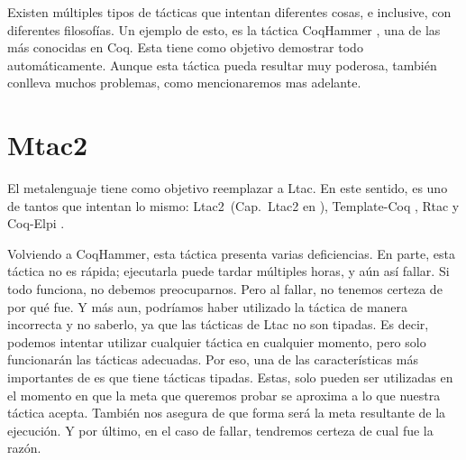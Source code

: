 Existen múltiples tipos de tácticas que intentan diferentes cosas, e inclusive, con diferentes filosofías.
Un ejemplo de esto, es la táctica CoqHammer \cite{DBLP:journals/jar/CzajkaK18}, una de las más conocidas en Coq. Esta tiene como objetivo demostrar todo automáticamente.
Aunque esta táctica pueda resultar muy poderosa, también conlleva muchos problemas, como mencionaremos mas adelante.

\section{Mtac2}

El metalenguaje \Mtac \cite{DBLP:journals/pacmpl/KaiserZKRD18} tiene como objetivo reemplazar a Ltac.
En este sentido, es uno de tantos que intentan lo mismo: Ltac2~(Cap.~Ltac2 en \cite{manual de referencia 8.11}), Template-Coq \cite{DBLP:conf/itp/AnandBCST18}, Rtac \cite{DBLP:conf/esop/MalechaB16} y Coq-Elpi \cite{tassi:hal-01637063}.

Volviendo a CoqHammer, esta táctica presenta varias deficiencias.
En parte, esta táctica no es rápida; ejecutarla puede tardar múltiples horas, y aún así fallar.
Si todo funciona, no debemos preocuparnos.
Pero al fallar, no tenemos certeza de por qué fue.
Y más aun, podríamos haber utilizado la táctica de manera incorrecta y no saberlo, ya que las tácticas de Ltac no son tipadas.
Es decir, podemos intentar utilizar cualquier táctica en cualquier momento, pero solo funcionarán las tácticas adecuadas.
Por eso, una de las características más importantes de \mtac es que tiene tácticas tipadas.
Estas, solo pueden ser utilizadas en el momento en que la meta que queremos probar se aproxima a lo que nuestra táctica acepta.
También nos asegura de que forma será la meta resultante de la ejecución.
Y por último, en el caso de fallar, tendremos certeza de cual fue la razón.

